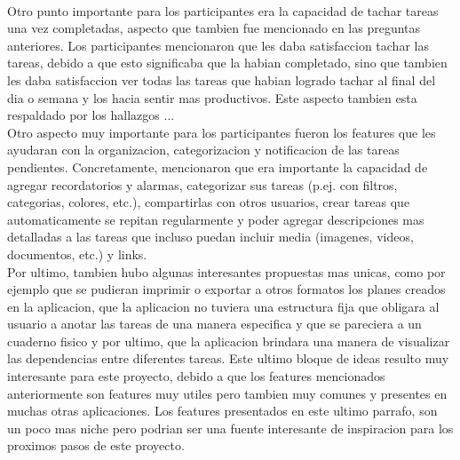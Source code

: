 \\
Otro punto importante para los participantes era la capacidad de tachar tareas una vez completadas, aspecto que tambien fue mencionado en las preguntas anteriores. Los participantes mencionaron que les daba satisfaccion tachar las tareas, debido a que esto significaba que la habian completado, sino que tambien les daba satisfaccion ver todas las tareas que habian logrado tachar al final del dia o semana y los hacia sentir mas productivos. Este aspecto tambien esta respaldado por los hallazgos ... 
\\
Otro aspecto muy importante para los participantes fueron los features que les ayudaran con la organizacion, categorizacion y notificacion de las tareas pendientes. Concretamente, mencionaron que era importante la capacidad de agregar recordatorios y alarmas, categorizar sus tareas (p.ej. con filtros, categorias, colores, etc.), compartirlas con otros usuarios, crear tareas que automaticamente se repitan regularmente y poder agregar descripciones mas detalladas a las tareas que incluso puedan incluir media (imagenes, videos, documentos, etc.) y links.\\
Por ultimo, tambien hubo algunas interesantes propuestas mas unicas, como por ejemplo que se pudieran imprimir o exportar a otros formatos los planes creados en la aplicacion, que la aplicacion no tuviera una estructura fija que obligara al usuario a anotar las tareas de una manera especifica y que se pareciera a un cuaderno fisico y por ultimo, que la aplicacion brindara una manera de visualizar las dependencias entre diferentes tareas. Este ultimo bloque de ideas resulto muy interesante para este proyecto, debido a que los features mencionados anteriormente son features muy utiles pero tambien muy comunes y presentes en muchas otras aplicaciones. Los features presentados en este ultimo parrafo, son un poco mas niche pero podrian ser una fuente interesante de inspiracion para los proximos pasos de este proyecto. 


